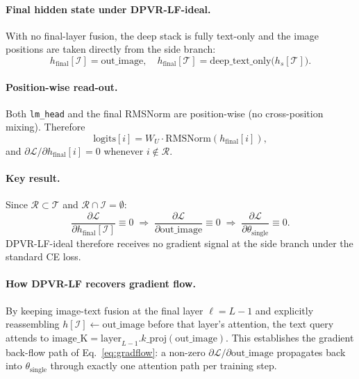 \documentclass[a4paper,fleqn,review]{cas-sc}
\newcommand{\dpvrlf}{DPVR-LF}
\newcommand{\dpvrlfideal}{DPVR-LF-ideal}
\begin{document}
\paragraph{Final hidden state under \dpvrlfideal{}.}
With no final-layer fusion, the deep stack is fully text-only and
the image positions are taken directly from the side branch:
\begin{equation*}
h_{\mathrm{final}}[\mathcal{I}] = \mathrm{out\_image},
\quad
h_{\mathrm{final}}[\mathcal{T}] =
\mathrm{deep\_text\_only}\bigl(h_{s}[\mathcal{T}]\bigr).
\end{equation*}

\paragraph{Position-wise read-out.}
Both \texttt{lm\_head} and the final RMSNorm are position-wise (no
cross-position mixing). Therefore
\begin{equation*}
\mathrm{logits}[i] = W_U \cdot \mathrm{RMSNorm}(h_{\mathrm{final}}[i]),
\end{equation*}
and $\partial \mathcal{L} / \partial h_{\mathrm{final}}[i] = 0$
whenever $i \notin \mathcal{R}$.

\paragraph{Key result.}
Since $\mathcal{R} \subset \mathcal{T}$ and $\mathcal{R} \cap
\mathcal{I} = \emptyset$:
\begin{equation*}
\frac{\partial \mathcal{L}}{\partial h_{\mathrm{final}}[\mathcal{I}]} \equiv 0
\;\Longrightarrow\;
\frac{\partial \mathcal{L}}{\partial \mathrm{out\_image}} \equiv 0
\;\Longrightarrow\;
\frac{\partial \mathcal{L}}{\partial \theta_{\mathrm{single}}} \equiv 0.
\end{equation*}
\dpvrlfideal{} therefore receives no gradient signal at the side
branch under the standard CE loss.

\paragraph{How \dpvrlf{} recovers gradient flow.}
By keeping image-text fusion at the final layer $\ell = L - 1$ and
explicitly reassembling $h[\mathcal{I}] \gets \mathrm{out\_image}$
before that layer's attention, the text query attends to
$\mathrm{image\_K} = \mathrm{layer}_{L-1}.k\_\mathrm{proj}
(\mathrm{out\_image})$. This establishes the gradient back-flow
path of Eq.~\eqref{eq:gradflow}: a non-zero
$\partial \mathcal{L} / \partial \mathrm{out\_image}$ propagates
back into $\theta_{\mathrm{single}}$ through exactly one attention
path per training step.
\end{document}

